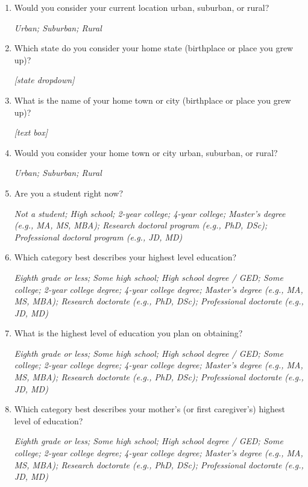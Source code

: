 \documentclass[11pt, headsepline]{article}
\begin{document}
\begin{enumerate}[resume]
    \textit{[text box]}

    \item Would you consider your current location urban, suburban, or rural?

    \textit{Urban; Suburban; Rural}

    \item Which state do you consider your home state (birthplace or place you grew up)?

    \textit{[state dropdown]}

    \item What is the name of your home town or city (birthplace or place you grew up)?

    \textit{[text box]}

    \item Would you consider your home town or city urban, suburban, or rural?

    \textit{Urban; Suburban; Rural}

    \item Are you a student right now?

    \textit{Not a student; High school; 2-year college; 4-year college; Master’s degree (e.g., MA, MS, MBA); Research doctoral program (e.g., PhD, DSc); Professional doctoral program (e.g., JD, MD)}

    \item Which category best describes your highest level education?

    \textit{Eighth grade or less; Some high school; High school degree / GED; Some college; 2-year college degree; 4-year college degree; Master’s degree (e.g., MA, MS, MBA); Research doctorate (e.g., PhD, DSc); Professional doctorate (e.g., JD, MD)}

    \item What is the highest level of education you plan on obtaining?

    \textit{Eighth grade or less; Some high school; High school degree / GED; Some college; 2-year college degree; 4-year college degree; Master’s degree (e.g., MA, MS, MBA); Research doctorate (e.g., PhD, DSc); Professional doctorate (e.g., JD, MD)}

    \item Which category best describes your mother's (or first caregiver's) highest level of education?

    \textit{Eighth grade or less; Some high school; High school degree / GED; Some college; 2-year college degree; 4-year college degree; Master’s degree (e.g., MA, MS, MBA); Research doctorate (e.g., PhD, DSc); Professional doctorate (e.g., JD, MD)}


\end{enumerate}
\end{document}
